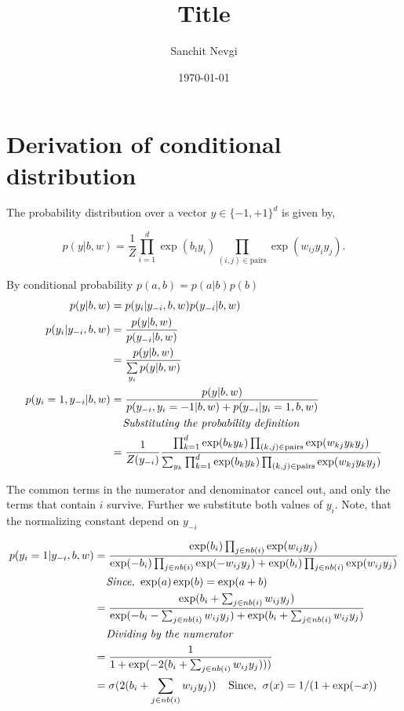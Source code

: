 \documentclass[11pt]{article}
\begin{document}
\title{\textbf{\huge{Title}}}

\date{\today}
\author{Sanchit Nevgi}

\section{Derivation of conditional distribution}
The probability distribution over a vector $y \in \{-1,+1\}^d$ is given by,

\[ p(y \vert b,w) = \frac{1}{Z} \prod_{i=1}^d \exp( b_i y_i ) \prod_{(i,j)\in \text{pairs}} \exp(w_{ij} y_i y_j). \]

By conditional probability $p(a, b) = p(a | b) p(b)$
\begin{equation}
    \begin{aligned}
        p(y | b, w) &= p(y_i | y_{-i}, b, w) p(y_{-i} | b, w) \\
        p(y_i | y_{-i}, b, w) &=  \frac{p(y | b, w)}{p(y_{-i} | b, w)} \\
        &= \frac{p(y | b, w)}{\sum\limits_{y_i} p(y | b, w)} \\
        p(y_i = 1, y_{-i} | b, w) &= \frac{p(y | b, w)}{p(y_{-i}, y_i=-1 | b, w) + p(y_{-i} | y_i = 1, b, w)} \\
        & \medskip \;\;\;\; \textit{Substituting the probability definition} \\
        &= \frac{1}{Z(y_{-i})} \frac{\prod_{k=1}^d \exp( b_k y_k ) \prod_{(k,j)\in \text{pairs}} \exp(w_{kj} y_k y_j)}{\sum_{y_k} \prod_{k=1}^d \exp( b_k y_k ) \prod_{(k,j)\in \text{pairs}} \exp(w_{kj} y_k y_j)}
    \end{aligned}
\end{equation}

The common terms in the numerator and denominator cancel out, and only the terms that contain $i$ survive. Further we substitute both values of $y_i$. Note, that the normalizing constant depend on $y_{-i}$

\begin{equation}
    \begin{aligned}
        p(y_i = 1 | y_{-i}, b, w) &= \frac{\exp (b_i) \prod_{j \in nb(i)} \exp (w_{ij} y_j)}{\exp (-b_i) \prod_{j \in nb(i)} \exp (-w_{ij} y_j) +  \exp (b_i) \prod_{j \in nb(i)} \exp (w_{ij} y_j)} \\
        & \medskip \;\;\;\; \textit{Since, } \exp(a) \exp(b) = \exp(a + b) \\
        &= \frac{\exp(b_i + \sum_{j \in nb(i)} w_{ij} y_j)}{\exp(-b_i - \sum_{j \in nb(i)} w_{ij} y_j) + \exp(b_i + \sum_{j \in nb(i)} w_{ij} y_j)} \\
        & \medskip \;\;\;\; \textit{Dividing by the numerator} \\
        &= \frac{1}{1 + \exp(- 2(b_i + \sum_{j \in nb(i)} w_{ij} y_j)))} \\
        &= \sigma(2(b_i + \sum_{j \in nb(i)} w_{ij} y_j)) \;\;\;\; \text{Since,} \;\; \sigma(x) = 1 / (1 + \exp(-x))
    \end{aligned}
\end{equation}
\end{document}
